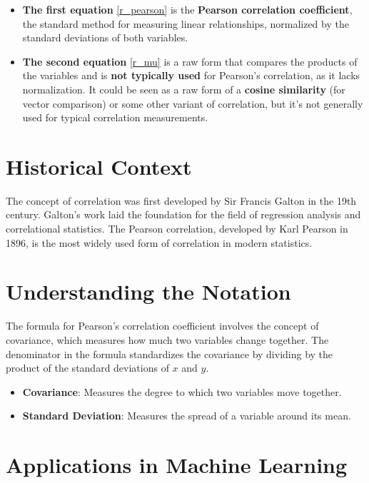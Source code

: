 \documentclass[
  12 pt,
  a4paper,
]{book}
\providecommand{\tightlist}{%
  \setlength{\itemsep}{0pt}\setlength{\parskip}{0pt}}
\numberwithin{equation}{section}
\theoremstyle{plain}      %
\theoremstyle{definition} %
\theoremstyle{remark}     %
\theoremstyle{note}         %
\begin{document}
\begin{itemize}
\tightlist
\item
  \textbf{The first equation} \ref{r_pearson} is the \textbf{Pearson
  correlation coefficient}, the standard method for measuring linear
  relationships, normalized by the standard deviations of both
  variables.
\item
  \textbf{The second equation} \ref{r_mu} is a raw form that compares
  the products of the variables and is \textbf{not typically used} for
  Pearson's correlation, as it lacks normalization. It could be seen as
  a raw form of a \textbf{cosine similarity} (for vector comparison) or
  some other variant of correlation, but it's not generally used for
  typical correlation measurements.
\end{itemize}

\hypertarget{historical-context-1}{%
\section{Historical Context}\label{historical-context-1}}

The concept of correlation was first developed by Sir Francis Galton in
the 19th century. Galton's work laid the foundation for the field of
regression analysis and correlational statistics. The Pearson
correlation, developed by Karl Pearson in 1896, is the most widely used
form of correlation in modern statistics.

\hypertarget{understanding-the-notation}{%
\section{Understanding the Notation}\label{understanding-the-notation}}

The formula for Pearson's correlation coefficient involves the concept
of covariance, which measures how much two variables change together.
The denominator in the formula standardizes the covariance by dividing
by the product of the standard deviations of \(x\) and \(y\).

\begin{itemize}
\tightlist
\item
  \textbf{Covariance}: Measures the degree to which two variables move
  together.
\item
  \textbf{Standard Deviation}: Measures the spread of a variable around
  its mean.
\end{itemize}

\hypertarget{applications-in-machine-learning-2}{%
\section{Applications in Machine
Learning}\label{applications-in-machine-learning-2}}
\end{document}
